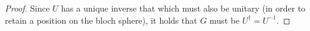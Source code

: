\documentclass{exam} %
\theoremstyle{plain}
\theoremstyle{definition}
\theoremstyle{remark}
\numberwithin{equation}{section}  %
\begin{document}
\begin{questions}
\begin{solution}
\begin{proof}
    Since $U$ has a unique inverse that which must also be unitary (in order to 
    retain a position on the bloch sphere), it 
    holds
    that $G$ must be $U^\dagger = U^{-1}$.
  \end{proof}
\end{solution}
\end{questions} 
\end{document}

